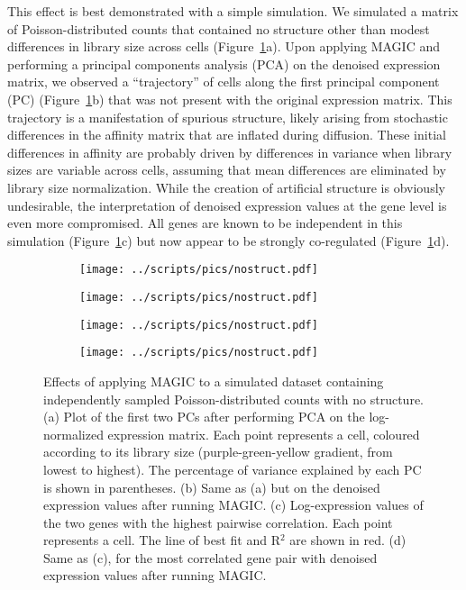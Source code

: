 \documentclass[10pt,letterpaper]{article}
\begin{document}
This effect is best demonstrated with a simple simulation.
We simulated a matrix of Poisson-distributed counts that contained no structure other than modest differences in library size across cells (Figure~\ref{fig:nostructure}a).
Upon applying MAGIC and performing a principal components analysis (PCA) on the denoised expression matrix, we observed a ``trajectory'' of cells along the first principal component (PC) (Figure~\ref{fig:nostructure}b) that was not present with the original expression matrix.
This trajectory is a manifestation of spurious structure, likely arising from stochastic differences in the affinity matrix that are inflated during diffusion.
These initial differences in affinity are probably driven by differences in variance when library sizes are variable across cells, assuming that mean differences are eliminated by library size normalization.
While the creation of artificial structure is obviously undesirable, the interpretation of denoised expression values at the gene level is even more compromised.
All genes are known to be independent in this simulation (Figure~\ref{fig:nostructure}c) but now appear to be strongly co-regulated (Figure~\ref{fig:nostructure}d).

\begin{figure}[btp]
\centering
\begin{subfigure}[b]{0.49\textwidth}
    \texttt{[image: ../scripts/pics/nostruct.pdf]}
    \caption{}
\end{subfigure}
\begin{subfigure}[b]{0.49\textwidth}
    \texttt{[image: ../scripts/pics/nostruct.pdf]}
    \caption{}
\end{subfigure}
\begin{subfigure}[b]{0.49\textwidth}
    \texttt{[image: ../scripts/pics/nostruct.pdf]}
    \caption{}
\end{subfigure}
\begin{subfigure}[b]{0.49\textwidth}
    \texttt{[image: ../scripts/pics/nostruct.pdf]}
    \caption{}
\end{subfigure}
\caption{Effects of applying MAGIC to a simulated dataset containing independently sampled Poisson-distributed counts with no structure.
(a) Plot of the first two PCs after performing PCA on the log-normalized expression matrix.
Each point represents a cell, coloured according to its library size (purple-green-yellow gradient, from lowest to highest).
The percentage of variance explained by each PC is shown in parentheses.
(b) Same as (a) but on the denoised expression values after running MAGIC.
(c) Log-expression values of the two genes with the highest pairwise correlation.
Each point represents a cell.
The line of best fit and R$^2$ are shown in red.
(d) Same as (c), for the most correlated gene pair with denoised expression values after running MAGIC.}
\label{fig:nostructure}
\end{figure}
\end{document}
